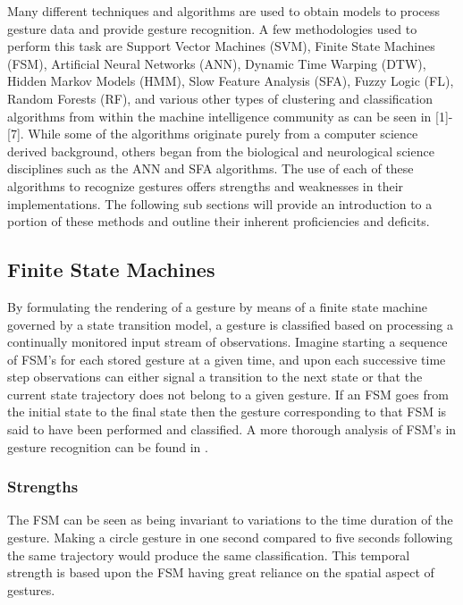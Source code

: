 \documentclass[conference]{IEEEtran}
\begin{document}


Many different techniques and algorithms are used to obtain models to process gesture data and provide gesture recognition. A few methodologies used to  perform this task are Support Vector Machines (SVM), Finite State Machines (FSM), Artificial Neural Networks (ANN), Dynamic Time Warping (DTW), Hidden Markov Models (HMM), Slow Feature Analysis (SFA), Fuzzy Logic (FL), Random Forests (RF), and various other types of clustering and classification algorithms from within the machine intelligence community as can be seen in [1]-[7]. While some of the algorithms originate purely from a computer science derived background, others began from the biological and neurological science disciplines such as the ANN and SFA algorithms. The use of each of these algorithms to recognize gestures offers strengths and weaknesses in their implementations. The following sub sections will provide an introduction to a portion of these methods and outline their inherent proficiencies and deficits.



\subsection{Finite State Machines}

By formulating the rendering of a gesture by means of a finite state machine governed by a state transition model, a gesture is classified based on processing a continually monitored input stream of observations. Imagine starting a sequence of FSM's for each stored gesture at a given time, and upon each successive time step observations can either signal a transition to the next state or that the current state trajectory does not belong to a given gesture. If an FSM goes from the initial state to the final state then the gesture corresponding to that FSM is said to have been performed and classified. A more thorough analysis of FSM's in gesture recognition can be found in \cite{FSM}.

\subsubsection{Strengths}
The FSM can be seen as being invariant to variations to the time duration of the gesture. Making a circle gesture in one second compared to five seconds following the same trajectory would produce the same classification. This temporal strength is based upon the FSM having great reliance on the spatial aspect of gestures.
\end{document}
